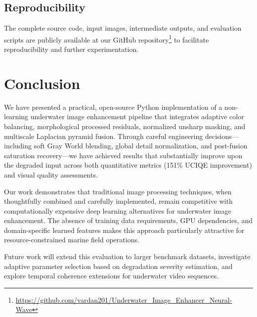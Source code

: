 \documentclass[conference]{IEEEtran}
\begin{document}
\subsection{Reproducibility}

The complete source code, input images, intermediate outputs, and evaluation scripts are publicly available at our GitHub repository\footnote{\url{https://github.com/vardan201/Underwater_Image_Enhancer_Neural-Wave}} to facilitate reproducibility and further experimentation.


\section{Conclusion}

We have presented a practical, open-source Python implementation of a non-learning underwater image enhancement pipeline that integrates adaptive color balancing, morphological processed residuals, normalized unsharp masking, and multiscale Laplacian pyramid fusion. Through careful engineering decisions---including soft Gray World blending, global detail normalization, and post-fusion saturation recovery---we have achieved results that substantially improve upon the degraded input across both quantitative metrics (151\% UCIQE improvement) and visual quality assessments.

Our work demonstrates that traditional image processing techniques, when thoughtfully combined and carefully implemented, remain competitive with computationally expensive deep learning alternatives for underwater image enhancement. The absence of training data requirements, GPU dependencies, and domain-specific learned features makes this approach particularly attractive for resource-constrained marine field operations.

Future work will extend this evaluation to larger benchmark datasets, investigate adaptive parameter selection based on degradation severity estimation, and explore temporal coherence extensions for underwater video sequences.
\end{document}

